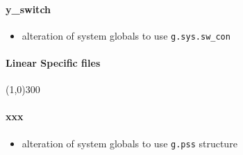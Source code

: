 \documentclass[12pt]{article}
\begin{document}
\paragraph{y\_switch}
	\begin{itemize}
		\item alteration of system globals to use \verb|g.sys.sw_con|
	\end{itemize}
	
	
\paragraph{Linear Specific files}\line(1,0){300}


\paragraph{xxx}
	\begin{itemize}
		\item alteration of system globals to use \verb|g.pss| structure
	\end{itemize}
	
\end{document}
